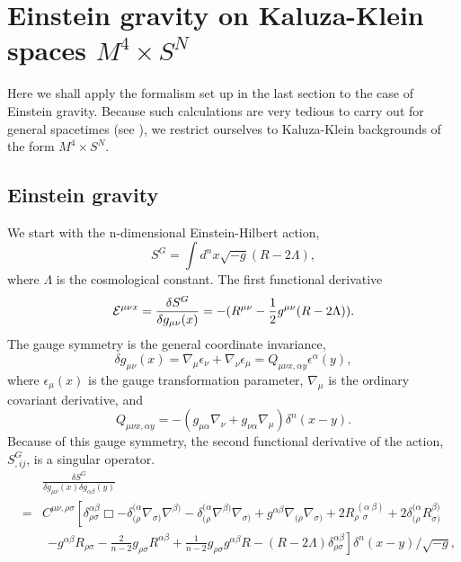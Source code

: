 \documentclass[a4paper,aps,preprint,groupedaddress,showpacs]{revtex4}
\begin{document}
\section{Einstein gravity on Kaluza-Klein spaces $M^{4}\times S^{N}$}

Here we shall apply the formalism set up in the last section to
the case of Einstein gravity. Because such calculations are very tedious to
carry out for general spacetimes (see \cite{CK1}), we  restrict ourselves to
Kaluza-Klein backgrounds of the form $M^{4}\times S^{N}$. 

\subsection{Einstein gravity}

We start with the n-dimensional Einstein-Hilbert action,
\begin{equation}
S^{G}=\int d^{n}\! x\sqrt{-g}(R-2\Lambda),
\end{equation}
where $\Lambda$ is the cosmological constant. The first functional
derivative
\begin{equation}
{\cal E}^{\mu\nu x}=
\frac{\delta S^{G}}{\delta g_{\mu\nu}(x)}=
-(R^{\mu\nu}-\frac{1}{2}g^{\mu\nu}(R-2\Lambda)).
\end{equation}
The gauge symmetry is the general coordinate invariance,
\begin{equation}
\delta g_{\mu\nu}(x)=\nabla_{\mu}\epsilon_{\nu}+
\nabla_{\nu}\epsilon_{\mu}=
Q_{\mu\nu x, \alpha y}\epsilon^{\alpha}(y),
\end{equation}
where $\epsilon_{\mu}(x)$ is the gauge transformation parameter,  
$\nabla_{\mu}$ is the ordinary covariant derivative, and
\begin{equation}
Q_{\mu\nu x, \alpha y}=-(g_{\mu\alpha}\nabla_{\nu}+
g_{\nu\alpha}\nabla_{\mu})\delta^{n}(x-y).
\end{equation}
Because of this gauge symmetry, the second functional derivative
of the action, $S^{G}_{,ij}$, is a singular operator.
\begin{eqnarray}
&&\frac{\delta S^{G}}{\delta g_{\mu\nu}(x)\delta g_{\alpha\beta}(y)}
\nonumber\\
&=&C^{\mu\nu,\rho\sigma}\left[
\delta^{\alpha\beta}_{\rho\sigma}\Box -
\delta^{(\alpha}_{(\rho}\nabla_{\sigma)}\nabla^{\beta)}-
\delta^{(\alpha}_{(\rho}\nabla^{\beta)}\nabla_{\sigma)}+
g^{\alpha\beta}\nabla_{(\rho}\nabla_{\sigma)}
+2R^{\ (\alpha\ \beta)}_{\rho\ \ \sigma}+
2\delta^{(\alpha}_{(\rho}R^{\beta)}_{\sigma)}\right.
\nonumber\\
&&\ \ \left.
-g^{\alpha\beta}R_{\rho\sigma}-
\frac{2}{n-2}g_{\rho\sigma}R^{\alpha\beta}+
\frac{1}{n-2}g_{\rho\sigma}g^{\alpha\beta}R-
(R-2\Lambda)\delta^{\alpha\beta}_{\rho\sigma}\right]
\delta^{n}(x-y)/\sqrt{-g},
\label{s2}
\end{eqnarray}
\end{document}
